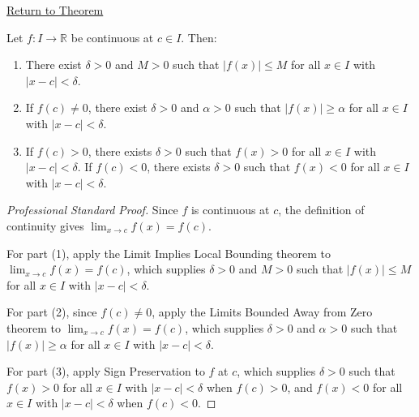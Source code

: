 \newpage
{}
\label{prf:local-properties-of-continuous-functions}

\begin{remark*}[Return]
\hyperref[thm:local-properties-of-continuous-functions]{Return to Theorem}
\end{remark*}

\begin{theorem*}
Let $f : I \to \mathbb{R}$ be continuous at $c \in I$. Then:
\begin{enumerate}[(1)]
\item There exist $\delta > 0$ and $M > 0$ such that $|f(x)| \leq M$ for all $x \in I$ with $|x - c| < \delta$.
\item If $f(c) \neq 0$, there exist $\delta > 0$ and $\alpha > 0$ such that $|f(x)| \geq \alpha$ for all $x \in I$ with $|x - c| < \delta$.
\item If $f(c) > 0$, there exists $\delta > 0$ such that $f(x) > 0$ for all $x \in I$ with $|x - c| < \delta$. If $f(c) < 0$, there exists $\delta > 0$ such that $f(x) < 0$ for all $x \in I$ with $|x - c| < \delta$.
\end{enumerate}
\end{theorem*}

\begin{proof}[Professional Standard Proof]
\LRAProofBodyStart
Since $f$ is continuous at $c$, the definition of continuity gives $\lim_{x \to c} f(x) = f(c)$.

For part (1), apply the Limit Implies Local Bounding theorem to $\lim_{x \to c} f(x) = f(c)$, which supplies $\delta > 0$ and $M > 0$ such that $|f(x)| \leq M$ for all $x \in I$ with $|x - c| < \delta$.

For part (2), since $f(c) \neq 0$, apply the Limits Bounded Away from Zero theorem to $\lim_{x \to c} f(x) = f(c)$, which supplies $\delta > 0$ and $\alpha > 0$ such that $|f(x)| \geq \alpha$ for all $x \in I$ with $|x - c| < \delta$.

For part (3), apply Sign Preservation to $f$ at $c$, which supplies $\delta > 0$ such that $f(x) > 0$ for all $x \in I$ with $|x - c| < \delta$ when $f(c) > 0$, and $f(x) < 0$ for all $x \in I$ with $|x - c| < \delta$ when $f(c) < 0$.
\end{proof}

